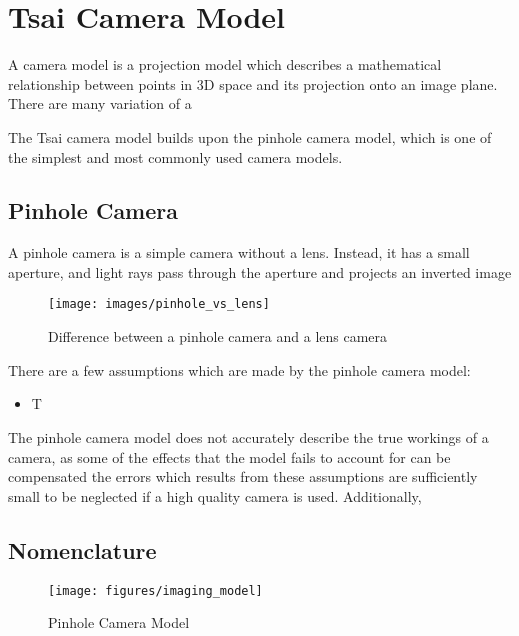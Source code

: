 \section{Tsai Camera Model}

A camera model is a projection model which describes a mathematical relationship between points in 3D space and its projection onto an image plane. There are many variation of a 

The Tsai camera model builds upon the pinhole camera model, which is one of the simplest and most commonly used camera models.

\subsection{Pinhole Camera}

A pinhole camera is a simple camera without a lens. Instead, it has a small aperture, and light rays pass through the aperture and projects an inverted image 

\begin{figure}[h!]
    \centering
    \texttt{[image: images/pinhole\_vs\_lens]}
    \caption{Difference between a pinhole camera and a lens camera}
\end{figure}



There are a few assumptions which are made by the pinhole camera model:
\begin{itemize}
    \item T
\end{itemize}

The pinhole camera model does not accurately describe the true workings of a camera, as some of the  effects that the model fails to account for can be compensated the errors which results from these assumptions are sufficiently small to be neglected if a high quality camera is used. Additionally,

\subsection{Nomenclature}

\begin{figure}[h!]
    \centering
    \texttt{[image: figures/imaging\_model]}
    \caption{Pinhole Camera Model}
\end{figure}


